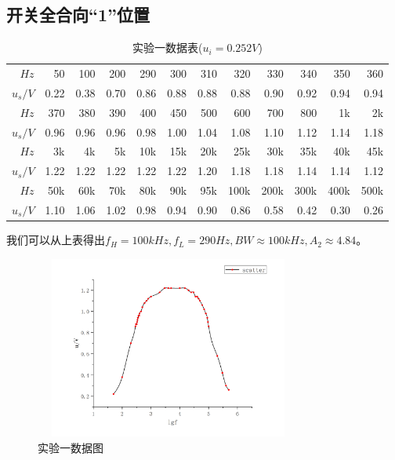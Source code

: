 \documentclass[a4 paper,12pt]{article}
\begin{document}
    \subsection{开关全合向“1”位置}
    \begin{table}[H]
    	\centering
    	\caption{实验一数据表($u_{i}=0.252V$)}
    	\label{实验一数据表}
    	\begin{tabular}{|r|r|r|r|r|r|r|r|r|r|r|r|}
    		\toprule[0.5mm]
    		$Hz$&50&100&200&290&300&310&320&330&340&350&360\\
    		$u_{s}/V$&0.22&0.38&0.70&0.86&0.88&0.88&0.88&0.90&0.92&0.94&0.94\\
    		\midrule
    		$Hz$&370&380&390&400&450&500&600&700&800&1k&2k\\
    		$u_{s}/V$&0.96&0.96&0.96&0.98&1.00&1.04&1.08&1.10&1.12&1.14&1.18\\
    		\midrule
    		$Hz$&3k&4k&5k&10k&15k&20k&25k&30k&35k&40k&45k\\
    		$u_{s}/V$&1.22&1.22&1.22&1.22&1.22&1.20&1.18&1.18&1.14&1.14&1.12\\
    		\midrule
    		$Hz$&50k&60k&70k&80k&90k&95k&100k&200k&300k&400k&500k\\
    		$u_{s}/V$&1.10&1.06&1.02&0.98&0.94&0.90&0.86&0.58&0.42&0.30&0.26\\
    		\bottomrule[0.5mm]
    	\end{tabular}
    \end{table}
\par 我们可以从上表得出$f_{H}=100kHz,f_{L}=290Hz,BW\approx 100kHz,A_{2}\approx 4.84$。
		\begin{figure}[H]
	\centering
	\includegraphics[width=8.8cm,height=6cm]  {实验一.png} 
	\caption{\label{1} 实验一数据图}
\end{figure}
\end{document}

